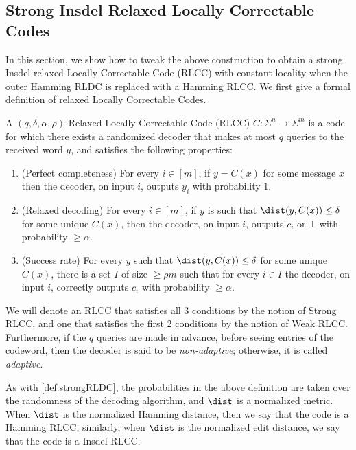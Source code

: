 \subsection{Strong Insdel Relaxed Locally Correctable Codes}\label{sec:rLCC}

In this section, we show how to tweak the above construction to obtain a strong Insdel relaxed Locally Correctable Code (RLCC) with constant locality when the outer Hamming RLDC is replaced with a Hamming RLCC. 
We first give a formal definition of relaxed Locally Correctable Codes.

\begin{definition}\label{def:rLCC}
    A $(q,\delta,\alpha,\rho)$-Relaxed Locally Correctable Code (RLCC) $C \colon \Sigma^n \rightarrow \Sigma^m$ is a code for which there exists a randomized decoder that makes at most $q$ queries to the received word $y$, and satisfies the following properties:
    \begin{enumerate}
        \item (Perfect completeness) For every $i \in [m]$, if $y = C(x)$ for some message $x$ then the decoder, on input $i$, outputs $y_i$ with probability $1$.
        
        \item (Relaxed decoding) For every $i \in [m]$, if $y$ is such that $\dist(y, C(x)) \leq \delta$ for some unique $C(x)$, then the decoder, on input $i$, outputs $c_i$ or $\bot$ with probability $\geq \alpha$.
        
        \item (Success rate) For every $y$ such that $\dist(y, C(x)) \leq \delta$ for some unique $C(x)$, there is a set $I$ of size $\geq \rho m$ such that for every $i \in I$ the decoder, on input $i$, correctly outputs $c_i$ with probability $\geq \alpha$.
    \end{enumerate}
    We will denote an RLCC that satisfies all 3 conditions by the notion of Strong RLCC, and one that satisfies the first 2 conditions by the notion of Weak RLCC. Furthermore,  if the $q$ queries are made in advance, before seeing entries of the codeword, then the decoder is said to be {\em non-adaptive}; otherwise, it is called {\em adaptive}.
\end{definition}
As with \cref{def:strongRLDC}, the probabilities in the above definition are taken over the randomness  of the decoding algorithm, and $\dist$ is a normalized metric.
When $\dist$ is the normalized Hamming distance, then we say that the code is a Hamming RLCC; similarly, when $\dist$ is the normalized edit distance, we say that the code is a Insdel RLCC.
